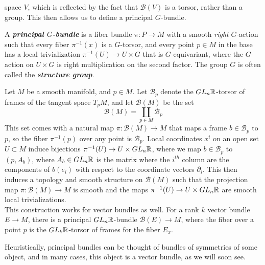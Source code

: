 \documentclass[abstract=on,twoside]{scrreprt}
\begin{document}
space $V$, which is reflected by the fact that $\mathcal{B}(V)$ is a torsor, rather
than a group. This then allows us to define a principal $G$-bundle.
%
\begin{definition}
A \textbf{\textit{principal $G$-bundle}} is a fiber bundle $\pi : P \to M$ with a
smooth \emph{right} $G$-action such that every fiber $\pi^{-1}(x)$ is a $G$-torsor,
and every point $p \in M$ in the base has a local trivialization
$\pi^{-1}(U) \to U \times G$ that is $G$-equivariant, where the $G$-action on
$U \times G$ is right multiplication on the second factor. The group $G$ is often
called the \textbf{\textit{structure group}}.
\end{definition}
%
\begin{example}
Let $M$ be a smooth manifold, and $p \in M$. Let $\mathcal{B}_p$ denote the
$GL_n\mathbb{R}$-torsor of frames of the tangent space $T_pM$, and let
$\mathcal{B}(M)$ be the set
\[
\mathcal{B}(M) = \coprod_{p \in M} \mathcal{B}_p
\]
This set comes with a natural map $\pi : \mathcal{B}(M) \to M$ that maps a frame
$b \in \mathcal{B}_p$ to $p$, so the fiber $\pi^{-1}(p)$ over any point is
$\mathcal{B}_p$. Local coordinates $x^i$ on an open set $U \subset M$ induce bijections
$\pi^{-1}(U) \to U \times GL_n\mathbb{R}$, where we map $b \in \mathcal{B}_p$ to
$(p, A_b)$, where $A_b \in GL_n\mathbb{R} $ is the matrix where the $i^{th}$ column are the
components of $b(e_i)$ with respect to the coordinate vectors $\partial_i$. This
then induces a topology and smooth structure on $\mathcal{B}(M)$ such that
the projection map $\pi : \mathcal{B}(M) \to M$ is smooth and the maps
$\pi^{-1}(U) \to U \times GL_n\mathbb{R}$ are smooth local trivializations. \\

This construction works for vector bundles as well. For a rank $k$ vector bundle
$E \to M$, there is a principal $GL_n\mathbb{R}$-bundle $\mathcal{B}(E) \to M$, where the fiber
over a point $p$ is the $GL_k\mathbb{R}$-torsor of frames for the fiber $E_x$.
\end{example}
%
Heuristically, principal bundles can be thought of bundles of symmetries of some
object, and in many cases, this object is a vector bundle, as we will soon see.
%
\end{document}
